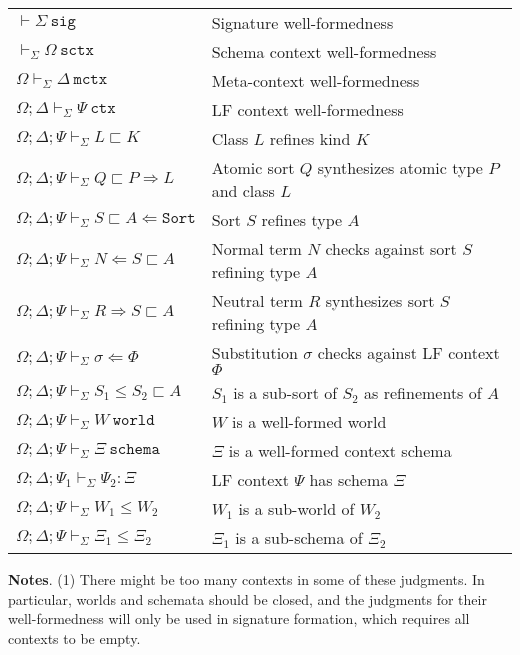 \documentclass[letterpaper, 11pt]{article}
\newcommand{\Rar}{\Rightarrow}
\newcommand{\Lar}{\Leftarrow}
\newcommand{\Sort}{\texttt{Sort}}
\newcommand{\world}{\texttt{world}}
\newcommand{\schema}{\texttt{schema}}
\newcommand{\ctx}{\texttt{ctx}}
\newcommand{\mctx}{\texttt{mctx}}
\newcommand{\sctx}{\texttt{sctx}}
\newcommand{\sig}{\texttt{sig}}
\begin{document}
    \begin{tabular}{ll}
        $ \vdash \Sigma \ \sig $                                       & Signature well-formedness \\
        $ \vdash_\Sigma \Omega \ \sctx$                                 & Schema context well-formedness \\
        $ \Omega \vdash_\Sigma \Delta \ \mctx $                         & Meta-context well-formedness \\
        $ \Omega; \Delta \vdash_\Sigma \Psi \ \ctx $                    & LF context well-formedness \\
        $ \Omega; \Delta; \Psi \vdash_\Sigma L \sqsubset K $            & Class $L$ refines kind $K$ \\
        $ \Omega; \Delta; \Psi \vdash_\Sigma Q \sqsubset P \Rar L $     & Atomic sort $Q$ synthesizes atomic type $P$ and class $L$ \\
        $ \Omega; \Delta; \Psi \vdash_\Sigma S \sqsubset A \Lar \Sort $ & Sort $S$ refines type $A$ \\
        $ \Omega; \Delta; \Psi \vdash_\Sigma N \Lar S \sqsubset A $     & Normal term $N$ checks against sort $S$ refining type $A$ \\
        $ \Omega; \Delta; \Psi \vdash_\Sigma R \Rar S \sqsubset A $     & Neutral term $R$ synthesizes sort $S$ refining type $A$ \\
        $ \Omega; \Delta; \Psi \vdash_\Sigma \sigma \Lar \Phi $         & Substitution $\sigma$ checks against LF context $\Phi$ \\
        $ \Omega; \Delta; \Psi \vdash_\Sigma S_1 \leq S_2 \sqsubset A $ & $S_1$ is a sub-sort of $S_2$ as refinements of $A$ \\
        $ \Omega; \Delta; \Psi \vdash_\Sigma W \ \world $               & $W$ is a well-formed world \\
        $ \Omega; \Delta; \Psi \vdash_\Sigma \Xi \ \schema $            & $\Xi$ is a well-formed context schema \\
        $ \Omega; \Delta; \Psi_1 \vdash_\Sigma \Psi_2 : \Xi $           & LF context $\Psi$ has schema $\Xi$ \\
        $ \Omega; \Delta; \Psi \vdash_\Sigma W_1 \leq W_2 $             & $W_1$ is a sub-world of $W_2$\\
        $ \Omega; \Delta; \Psi \vdash_\Sigma \Xi_1 \leq \Xi_2 $         & $\Xi_1$ is a sub-schema of $\Xi_2$
    \end{tabular}

    \textbf{Notes}. (1) There might be too many contexts in some of these judgments.  In particular, worlds and schemata should be closed, and the judgments
    for their well-formedness will only be used in signature formation, which requires all contexts to be empty.
    
\end{document}
